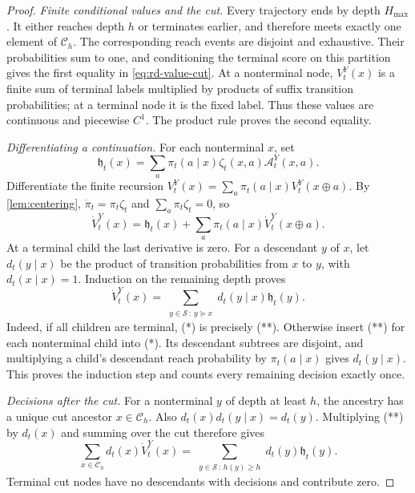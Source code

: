 \begin{proof}
\emph{Finite conditional values and the cut.}
Every trajectory ends by depth $H_{\max}$. It either reaches depth $h$ or terminates earlier, and therefore meets exactly one element of $\mathcal C_h$. The corresponding reach events are disjoint and exhaustive. Their probabilities sum to one, and conditioning the terminal score on this partition gives the first equality in \cref{eq:rd-value-cut}. At a nonterminal node, $V_t^Y(x)$ is a finite sum of terminal labels multiplied by products of suffix transition probabilities; at a terminal node it is the fixed label. Thus these values are continuous and piecewise $C^1$. The product rule proves the second equality.

\emph{Differentiating a continuation.}
For each nonterminal $x$, set
\[
 \mathfrak h_t(x)=\sum_a\pi_t(a\mid x)\zeta_t(x,a)\mathcal A_t^Y(x,a).
\]
Differentiate the finite recursion $V_t^Y(x)=\sum_a\pi_t(a\mid x)V_t^Y(x\oplus a)$. By \cref{lem:centering}, $\dot\pi_t=\pi_t\zeta_t$ and $\sum_a\pi_t\zeta_t=0$, so
\[
 \dot V_t^Y(x)=\mathfrak h_t(x)+
             \sum_a\pi_t(a\mid x)\dot V_t^Y(x\oplus a).
 \tag{*}
\]
At a terminal child the last derivative is zero. For a descendant $y$ of $x$, let $d_t(y\mid x)$ be the product of transition probabilities from $x$ to $y$, with $d_t(x\mid x)=1$. Induction on the remaining depth proves
\[
 \dot V_t^Y(x)=\sum_{\substack{y\in\mathcal S\,:\,y\succeq x}}
                     d_t(y\mid x)\mathfrak h_t(y).
 \tag{**}
\]
Indeed, if all children are terminal, (*) is precisely (**). Otherwise insert (**) for each nonterminal child into (*). Its descendant subtrees are disjoint, and multiplying a child's descendant reach probability by $\pi_t(a\mid x)$ gives $d_t(y\mid x)$. This proves the induction step and counts every remaining decision exactly once.

\emph{Decisions after the cut.}
For a nonterminal $y$ of depth at least $h$, the ancestry has a unique cut ancestor $x\in\mathcal C_h$. Also $d_t(x)d_t(y\mid x)=d_t(y)$. Multiplying (**) by $d_t(x)$ and summing over the cut therefore gives
\[
 \sum_{x\in\mathcal C_h}d_t(x)\dot V_t^Y(x)
 =\sum_{\substack{y\in\mathcal S\,:\,h(y)\ge h}}d_t(y)\mathfrak h_t(y).
\]
Terminal cut nodes have no descendants with decisions and contribute zero.


\end{proof}
